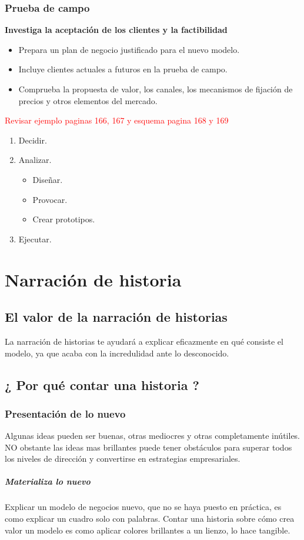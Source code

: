 \documentclass[11pt]{book}
\begin{document}
\subsection{Prueba de campo}
\textbf{Investiga la aceptación de los clientes y la factibilidad}
\begin{itemize}
\item Prepara un plan de negocio justificado para el nuevo modelo.
\item Incluye clientes actuales a futuros en la prueba de campo.
\item Comprueba la propuesta de valor, los canales, los mecanismos de fijación de precios y otros elementos del mercado.
\end{itemize}
\textcolor{red}{Revisar ejemplo paginas 166, 167 y esquema pagina 168 y 169}
\begin{enumerate}
\item Decidir. 
\item Analizar.
\begin{itemize}
\item Diseñar.
\item Provocar.
\item Crear prototipos.
\end{itemize}
\item Ejecutar.
\end{enumerate}
\chapter{Narración de historia}
\section{El valor de la narración de historias}
La narración de historias te ayudará a explicar eficazmente en qué consiste el modelo, ya que acaba con la incredulidad ante lo desconocido.
\section{¿ Por qué contar una historia ?}
\subsection{Presentación de lo nuevo}
Algunas ideas pueden ser buenas, otras mediocres y otras completamente inútiles. NO obstante las ideas mas brillantes puede tener obstáculos para superar todos los niveles de dirección y convertirse en estrategias empresariales.
\paragraph{Materializa lo nuevo}
Explicar un modelo de negocios nuevo, que no se haya puesto en práctica, es como explicar un cuadro solo con palabras. Contar una historia sobre cómo crea valor un modelo es como aplicar colores brillantes a un lienzo, lo hace tangible.
\end{document}
